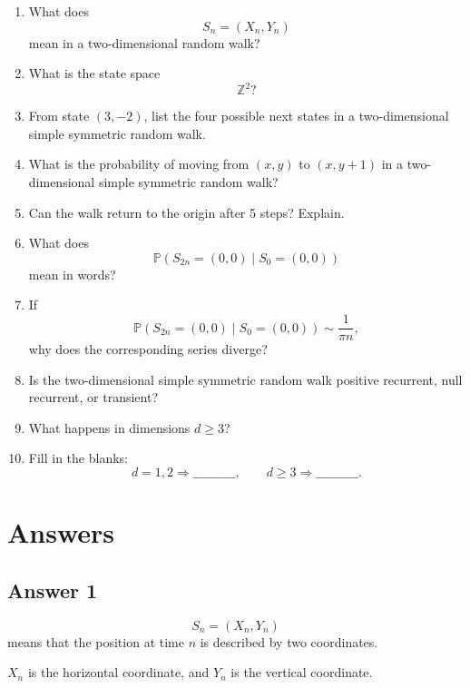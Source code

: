 \documentclass[12pt,a4paper]{article}
\theoremstyle{notestyle}
\newcommand{\Prob}{\mathbb{P}}
\begin{document}
\begin{enumerate}[label=\textbf{Q\arabic*.}, leftmargin=1.2cm]
    \item What does
    \[
    S_n=(X_n,Y_n)
    \]
    mean in a two-dimensional random walk?

    \item What is the state space
    \[
    \mathbb{Z}^2?
    \]

    \item From state $(3,-2)$, list the four possible next states in a two-dimensional simple symmetric random walk.

    \item What is the probability of moving from $(x,y)$ to $(x,y+1)$ in a two-dimensional simple symmetric random walk?

    \item Can the walk return to the origin after 5 steps? Explain.

    \item What does
    \[
    \Prob(S_{2n}=(0,0)\mid S_0=(0,0))
    \]
    mean in words?

    \item If
    \[
    \Prob(S_{2n}=(0,0)\mid S_0=(0,0))\sim \frac1{\pi n},
    \]
    why does the corresponding series diverge?

    \item Is the two-dimensional simple symmetric random walk positive recurrent, null recurrent, or transient?

    \item What happens in dimensions $d\geq3$?

    \item Fill in the blanks:
    \[
    d=1,2 \Rightarrow \text{__________},
    \qquad
    d\geq3 \Rightarrow \text{__________}.
    \]
\end{enumerate}

\section{Answers}

\subsection*{Answer 1}

\[
S_n=(X_n,Y_n)
\]
means that the position at time $n$ is described by two coordinates.

$X_n$ is the horizontal coordinate, and $Y_n$ is the vertical coordinate.
\end{document}

